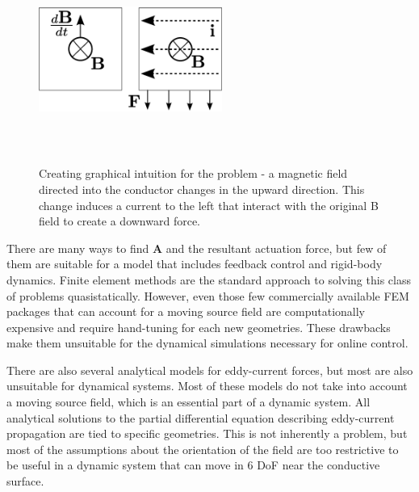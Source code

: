 

\begin{figure}
\includegraphics[width = 6cm, height = 6cm ]{figures/force_generation_diag.eps}
\label{fig:force_generation}
\caption{Creating graphical intuition for the problem - a magnetic field directed into the conductor changes in the upward direction. This change induces a current to the left that interact with the original B field to create a downward force.}
\end{figure}

There are many ways to find \textbf{A} and the resultant actuation force, but few of them are suitable for a model that includes feedback control and rigid-body dynamics. \cite{Paudel2013}
Finite element methods are the standard approach to solving this class of problems quasistatically. However, even those few commercially available FEM packages that can account for a moving source field are computationally expensive and require hand-tuning for each new geometries. These drawbacks make them unsuitable for the dynamical simulations necessary for online control. 

There are also several analytical models for eddy-current forces, but most are also unsuitable for dynamical systems. Most of these models do not take into account a moving source field, which is an essential part of a dynamic system. All analytical solutions to the partial differential equation describing eddy-current propagation are tied to specific geometries. This is not inherently a problem, but most of the assumptions about the orientation of the field are too restrictive to be useful in a dynamic system that can move in 6 DoF near the conductive surface. 


